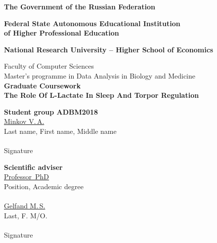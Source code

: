 \documentclass[14pt,a4paper]{scrartcl}
\begin{document}
  \begin{titlepage}
      \begin{center}
        \large
        \textbf{The Government of the Russian Federation}
        
        \textbf{Federal State Autonomous Educational Institution\\of Higher Professional Education}
        \vspace{0.25cm}
        
       \textbf{National Research University – Higher School of Economics}
       \vspace{0.25cm}

        Faculty of Computer Sciences
        \\Master's programme in Data Analysis in Biology and Medicine\\[1cm]
        
        \textbf{Graduate Coursework}
        \\[0.5cm]
        \textbf{\guillemotleft The Role Of L-Lactate In Sleep And Torpor Regulation \guillemotright}
        \vfill
         
      \end{center}

  \newlength{\ML}
  \hfill\begin{minipage}{0.4\textwidth}
    \textbf{Student group ADBM2018}\\[0.3cm]
    \underline{Minkov V.\,A.} \\
    \scriptsize{Last name, First name, Middle name}\\\\
    \large
    \underline{\hspace{7cm}}
    \scriptsize{Signature}\\
      \end{minipage}%


  \hfill\begin{minipage}{0.4\textwidth}
    \textbf{Scientific adviser}\\[0.3cm]
    \underline{Professor\, PhD} \\
    \scriptsize{Position, Academic degree}\\\\
    \large
    \underline{Gelfand M.\,S.} \\
    \scriptsize{Last, F. M/O.}\\\\
    \underline{\hspace{7cm}}
    \scriptsize{Signature}\\
      \end{minipage}


\end{titlepage}
\end{document}
